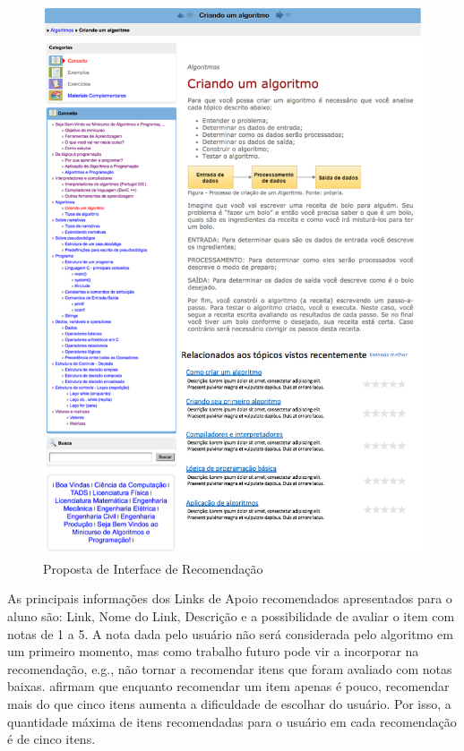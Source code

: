 \begin{figure}[htb]
  \caption{\label{fig:adaptweb-proposta-recomendacao}Proposta de Interface de Recomendação}
  \begin{center}
      \includegraphics[scale=1.0]{./Figuras/recomendacoes_v2.png}
  \end{center}
\end{figure}

As principais informações dos Links de Apoio recomendados apresentados para o aluno são: Link, Nome do Link, Descrição e a possibilidade de avaliar o item
com notas de 1 a 5. A nota dada pelo usuário não será considerada pelo algoritmo em um primeiro momento, mas como trabalho
futuro pode vir a incorporar na recomendação, e.g., não tornar a recomendar itens que foram avaliado com notas baixas.
 afirmam que enquanto recomendar um item apenas é pouco, recomendar mais do que cinco itens
aumenta a dificuldade de escolhar do usuário. Por isso, a quantidade máxima de itens recomendadas para o usuário em cada
recomendação é de cinco itens.

